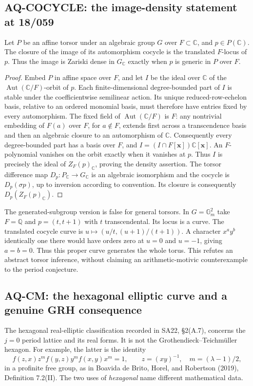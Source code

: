 \documentclass[11pt,a4paper]{article}
\theoremstyle{definition}\newtheorem{definition}[theorem]{Definition}
\theoremstyle{remark}\newtheorem{remark}[theorem]{Remark}
\begin{document}
\subsection{AQ-COCYCLE: the image-density statement at 18/059}
Let $P$ be an affine torsor under an algebraic group $G$
over $F\subset\mathbb C$, and $p\in P(\mathbb C)$.
The closure of the image of its automorphism cocycle
is the translated $F$-locus of $p$. Thus the image is
Zariski dense in $G_{\mathbb C}$ exactly when $p$ is
generic in $P$ over $F$.
\begin{proof}
Embed $P$ in affine space over $F$, and let $I$ be the
ideal over $\mathbb C$ of the
$\operatorname{Aut}(\mathbb C/F)$-orbit of $p$.
Each finite-dimensional degree-bounded part of $I$
is stable under the coefficientwise semilinear action.
Its unique reduced-row-echelon basis, relative to an
ordered monomial basis, must therefore have entries
fixed by every automorphism. The fixed field of
$\operatorname{Aut}(\mathbb C/F)$ is $F$: any nontrivial
embedding of $F(a)$ over $F$, for $a\notin F$, extends
first across a transcendence basis and then an algebraic
closure to an automorphism of $\mathbb C$.
Consequently every degree-bounded part has a basis
over $F$, and $I=(I\cap F[\mathbf x])\mathbb C[\mathbf x]$.
An $F$-polynomial vanishes on the orbit exactly when
it vanishes at $p$. Thus $I$ is precisely the ideal of
$Z_F(p)_{\mathbb C}$, proving the density assertion.
The torsor difference map $D_p:P_{\mathbb C}\to G_{\mathbb C}$
is an algebraic isomorphism and the cocycle is
$D_p(\sigma p)$, up to inversion according to convention.
Its closure is consequently $D_p(Z_F(p)_{\mathbb C})$.
\end{proof}
The generated-subgroup version is false for general
torsors. In $G=\mathbb G_m^2$ take $F=\mathbb Q$ and
$p=(t,t+1)$ with $t$ transcendental. Its locus is a curve.
The translated cocycle curve is
$u\mapsto(u/t,(u+1)/(t+1))$.
A character $x^a y^b$ identically one there would have
orders zero at $u=0$ and $u=-1$, giving $a=b=0$.
Thus this proper curve generates the whole torus.
This refutes an abstract torsor inference, without
claiming an arithmetic-motivic counterexample to the
period conjecture.

\subsection{AQ-CM: the hexagonal elliptic curve and a genuine GRH consequence}
The hexagonal real-elliptic classification recorded in SA22,
\S2(A.7), concerns the $j=0$ period lattice and its real
forms. It is not the Grothendieck--Teichm\"uller hexagon.
For example, the latter is the identity
\[
 f(z,x)z^m f(y,z)y^m f(x,y)x^m=1,\qquad
 z=(xy)^{-1},\quad m=(\lambda-1)/2,
\]
in a profinite free group, as in Boavida de Brito, Horel,
and Robertson (2019), Definition 7.2(II). The two uses of
\emph{hexagonal} name different mathematical data.
\end{document}
